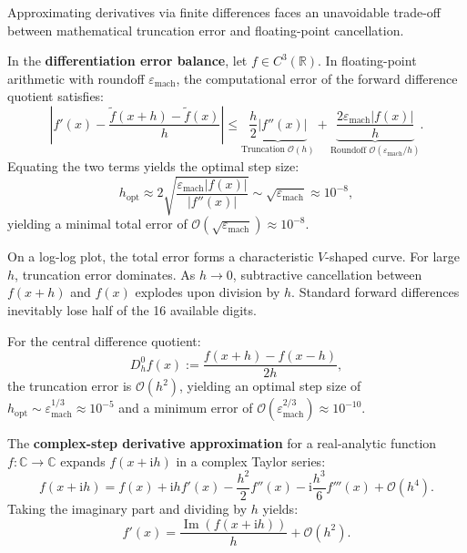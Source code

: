 Approximating derivatives via finite differences faces an unavoidable trade-off between mathematical truncation error and floating-point cancellation.

\begin{theorem}
    In the \textbf{differentiation error balance}, let $f \in C^3(\mathbb{R})$. In floating-point arithmetic with roundoff $\varepsilon_{\text{mach}}$, the computational error of the forward difference quotient satisfies:
    \begin{equation}
        \left| f'(x) - \frac{\tilde{f}(x+h) - \tilde{f}(x)}{h} \right| \le \underbrace{\frac{h}{2} |f''(x)|}_{\text{Truncation } \mathcal{O}(h)} + \underbrace{\frac{2 \varepsilon_{\text{mach}} |f(x)|}{h}}_{\text{Roundoff } \mathcal{O}(\varepsilon_{\text{mach}} / h)}.
    \end{equation}
    Equating the two terms yields the optimal step size:
    \begin{equation}
        h_{\text{opt}} \approx 2 \sqrt{\frac{\varepsilon_{\text{mach}} |f(x)|}{|f''(x)|}} \sim \sqrt{\varepsilon_{\text{mach}}} \approx 10^{-8},
    \end{equation}
    yielding a minimal total error of $\mathcal{O}(\sqrt{\varepsilon_{\text{mach}}}) \approx 10^{-8}$.
\end{theorem}

On a log-log plot, the total error forms a characteristic $V$-shaped curve. For large $h$, truncation error dominates. As $h \to 0$, subtractive cancellation between $f(x+h)$ and $f(x)$ explodes upon division by $h$. Standard forward differences inevitably lose half of the 16 available digits.

For the central difference quotient:
\begin{equation}
    D_h^0 f(x) := \frac{f(x+h) - f(x-h)}{2h},
\end{equation}
the truncation error is $\mathcal{O}(h^2)$, yielding an optimal step size of $h_{\text{opt}} \sim \varepsilon_{\text{mach}}^{1/3} \approx 10^{-5}$ and a minimum error of $\mathcal{O}(\varepsilon_{\text{mach}}^{2/3}) \approx 10^{-10}$.

\begin{theorem}
    The \textbf{complex-step derivative approximation} for a real-analytic function $f: \mathbb{C} \to \mathbb{C}$ expands $f(x + \mathrm{i}h)$ in a complex Taylor series:
    \begin{equation}
        f(x + \mathrm{i}h) = f(x) + \mathrm{i}h f'(x) - \frac{h^2}{2} f''(x) - \mathrm{i}\frac{h^3}{6} f'''(x) + \mathcal{O}(h^4).
    \end{equation}
    Taking the imaginary part and dividing by $h$ yields:
    \begin{equation}
        f'(x) = \frac{\operatorname{Im}(f(x + \mathrm{i}h))}{h} + \mathcal{O}(h^2).
    \end{equation}
\end{theorem}

